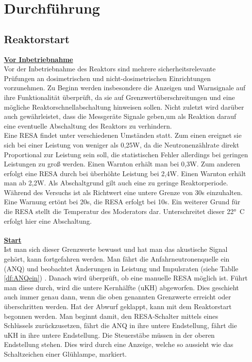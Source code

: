 \section{Durchführung}
    \subsection{Reaktorstart}
    \underline{\textbf{Vor Inbetriebnahme}}  \\ 
    Vor der Inbetriebnahme des Reaktors sind mehrere sicherheitsrelevante Prüfungen an dosimetrischen und nicht-dosimetrischen Einrichtungen vorzunehmen. Zu Beginn werden insbesondere die Anzeigen und Warnsignale auf ihre Funktionalität überprüft, da sie auf Grenzwertüberschreitungen und eine mögliche Reaktorschnellabschaltung hinweisen sollen. Nicht zuletzt wird darüber auch gewährleistet, dass die Messgeräte Signale geben,um als Reaktion darauf eine eventuelle Abschaltung des Reaktors zu verhindern.\\
    Eine RESA findet unter verschiedenen Umständen statt. Zum einen ereignet sie sich bei einer Leistung von weniger als 0,25\unit{W}, da die Neutronenzählrate direkt Proportional zur Leistung sein soll, die statistischen Fehler allerdings bei geringen Leistungen zu groß werden. Einen Warnton erhält man bei 0,3\unit{W}. Zum anderen erfolgt eine RESA durch bei überhöhte Leistung bei 2,4\unit{W}. Einen Warnton erhält man ab 2,2\unit{W}.
    Als Abschaltgrund gilt auch eine zu geringe Reaktorperiode. Während des Versuchs ist als Richtwert eine untere Grenze von 30\unit{s} einzuhalten. Eine Warnung ertönt bei 20\unit{s}, die RESA erfolgt bei 10\unit{s}.
    Ein weiterer Grund für die RESA stellt die Temperatur des Moderators dar. Unterschreitet dieser 22\unit{°C} erfolgt hier eine Abschaltung.\\ \ \\
    \underline{\textbf{Start}}\\
    Ist man sich dieser Grenzwerte bewusst und hat man das akustische Signal gehört, kann fortgefahren werden. Man fährt die Anfahrneutronenquelle ein (ANQ) und beobachtet Änderungen in Leistung und Impulsraten (siehe Tablle \ref{df:ANQein}) . Danach wird überprüft, ob eine manuelle RESA möglich ist. Führt man diese durch, wird die untere Kernhälfte (uKH) abgeworfen. Dies geschieht auch immer genau dann, wenn die oben genannten Grenzwerte erreicht oder überschritten werden. 
    Hat der Abwurf geklappt, kann mit dem Reaktorstart begonnen werden. Man beginnt damit, den RESA-Schalter mittels eines Schlüssels zurückzusetzen, fährt die ANQ in ihre untere Endstellung, fährt die uKH in ihre untere Endstellung. Die Steuerstäbe müssen in der oberen Endstellung stehen. Dies wird durch eine Anzeige, welche so aussieht wie das Schaltzeichen einer Glühlampe, markiert.
